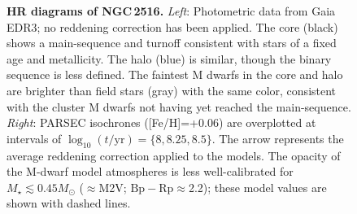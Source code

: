 \documentclass[12pt,twocolumn,tighten]{aastex63}
\begin{document}
\begin{figure}[t]
	\begin{center}
		\leavevmode
	\end{center}
	\vspace{-0.7cm}
  \caption{ {\bf HR diagrams of NGC\,2516.}
    {\it Left}: Photometric data from Gaia EDR3; no reddening
    correction has been applied.  The core (black) shows a
    main-sequence and turnoff consistent with stars of a fixed age and
    metallicity.  The halo (blue) is similar, though the binary
    sequence is less defined.  The faintest M dwarfs in the core and
    halo are brighter than field stars (gray) with the same color,
    consistent with the cluster M dwarfs not having yet reached the
    main-sequence.  {\it Right}: PARSEC isochrones ([Fe/H]=+0.06) are
    overplotted at intervals of $\log_{10}(t/\mathrm{yr})=\{8, 8.25,
    8.5\}$.  The arrow represents the average reddening correction
    applied to the models.  The opacity of the M-dwarf model
    atmospheres is less well-calibrated for $M_\star \lesssim
    0.45M_\odot$ ($\approx$M2V; $\mathrm{Bp}-\mathrm{Rp}\approx$2.2);
    these model values are shown with dashed lines.
    \label{fig:hr}
  }
\end{figure}
\end{document}
